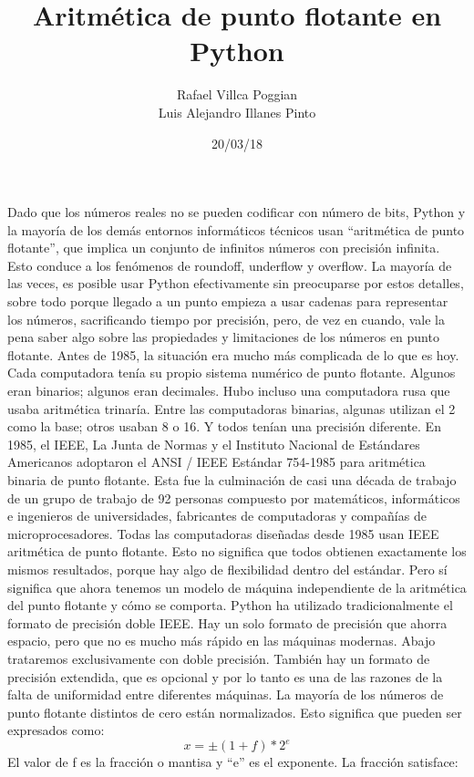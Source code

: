 \documentclass[12pt]{article}
\title{Aritmética de punto flotante en Python}
\author{Rafael Villca Poggian\\Luis Alejandro Illanes Pinto}
\date{20/03/18}
\begin{document}
\maketitle
\graphicspath{ {/home/rafael/Desktop/Codes/Analisis_Numerico/art/} }
Dado que los números reales no se pueden codificar con número de bits, Python y la mayoría de los demás entornos informáticos técnicos usan “aritmética de punto flotante”, que implica un conjunto de infinitos números con precisión infinita. Esto conduce a los fenómenos de roundoff, underflow y overflow. La mayoría de las veces, es posible usar Python efectivamente sin preocuparse por estos detalles, sobre todo porque llegado a un punto empieza a usar cadenas para representar los n\'umeros, sacrificando tiempo por precisi\'on, pero, de vez en cuando, vale la pena saber algo sobre las propiedades y limitaciones de los números en punto flotante.
Antes de 1985, la situación era mucho más complicada de lo que es hoy. Cada computadora tenía su propio sistema numérico de punto flotante. Algunos eran binarios; algunos eran decimales. Hubo incluso una computadora rusa que usaba aritmética trinaría. Entre las computadoras binarias, algunas utilizan el 2 como la base; otros usaban 8 o 16. Y todos tenían una precisión diferente. En 1985, el IEEE, La Junta de Normas y el Instituto Nacional de Estándares Americanos adoptaron el ANSI / IEEE Estándar 754-1985 para aritmética binaria de punto flotante. Esta fue la culminación de casi una década de trabajo de un grupo de trabajo de 92 personas compuesto por matemáticos, informáticos e ingenieros de universidades, fabricantes de computadoras y compañías de microprocesadores.
Todas las computadoras diseñadas desde 1985 usan IEEE aritmética de punto flotante. Esto no significa que todos obtienen exactamente los mismos resultados, porque hay algo de flexibilidad dentro del estándar. Pero sí significa que ahora tenemos un modelo de máquina independiente de la aritmética del punto flotante y cómo se comporta. 
Python ha utilizado tradicionalmente el formato de precisión doble IEEE. Hay un solo formato de precisión que ahorra espacio, pero que no es mucho más rápido en las máquinas modernas. Abajo trataremos exclusivamente con doble precisión. También hay un formato de precisión extendida, que es opcional y por lo tanto es una de las razones de la falta de uniformidad entre diferentes máquinas.
La mayoría de los números de punto flotante distintos de cero están normalizados. Esto significa que pueden ser expresados como:
$$x = \pm{(1+f)}*2^e$$
El valor de f es la fracción o mantisa y “e” es el exponente. La fracción satisface:
\end{document}
